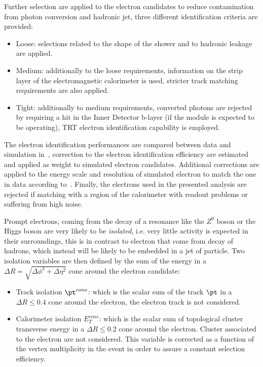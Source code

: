 Further selection are applied to the electron candidates to reduce contamination
from photon conversion and hadronic jet, three different identification criteria are provided:
\begin{itemize}
	\item Loose: selections related to the shape of the shower and to hadronic leakage are applied.
	\item Medium: additionally to the loose requirements, information on the strip layer of the electromagnetic
	calorimeter is used, stricter track matching requirements are also applied.
	\item Tight: additionally to medium requirements, 
		converted photons are rejected by requiring a hit in the Inner Detector b-layer (if the module
		is expected to be operating), TRT electron identification capability is employed.
\end{itemize}

The electron identification performances are compared between data and simulation in~\cite{eleEff}, 
correction to the electron identification efficiency are estimated and 
applied as weight to simulated electron candidates. Additional corrections are applied to the energy scale and resolution
of simulated electron to match the one in data according to~\cite{eleEnergy}.
Finally, the electrons used in the presented analysis are rejected if matching 
with a region of the calorimeter with readout problems or suffering from high noise.

Prompt electrons, coming from the decay of a resonance like the $Z^0$ boson or the Higgs boson are very
likely to be \emph{isolated}, i.e. very little activity is expected in their surroundings, this is in contrast
to electron that come from decay of hadrons, which instead will be likely to be embedded in a jet of particle.
Two isolation variables are then defined by the sum of the energy in a $\Delta R = \sqrt{\Delta\phi^2 + \Delta\eta^2}$ 
cone around the electron candidate:
\begin{itemize}
	\item Track isolation $\pt^{cone}$: which is the scalar sum of the track $\pt$ in a $\Delta R \leq 0.4$
	cone around the electron, the electron track is not considered.
	
	\item Calorimeter isolation $E_T^{cone}$: which is the scalar sum of  topological cluster transverse energy
	 in a  $\Delta R \leq 0.2$ cone around the electron. Cluster associated to the electron are not considered.
	 This variable is corrected as a function of the vertex multiplicity in the event in order to assure a constant 
	 selection efficiency.
\end{itemize}



